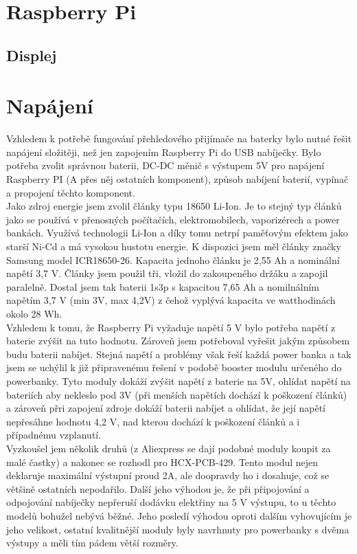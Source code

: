 \documentclass{ctuthesis}
\begin{document}
\section{Raspberry Pi}
\subsection{Displej}

\section{Napájení}
Vzhledem k potřebě fungování přehledového přijímače na baterky bylo nutné řešit napájení složitěji, než jen zapojením Raspberry Pi do USB nabíječky. Bylo potřeba zvolit správnou baterii, DC-DC měnič s výstupem 5V pro napájení Raspberry PI (A přes něj ostatních komponent), způsob nabíjení baterií, vypínač a propojení těchto komponent.\\
 Jako zdroj energie jsem zvolil články typu 18650 Li-Ion. Je to stejný typ článků jako se používá v přenosných počítačích, elektromobilech, vaporizérech a power bankách. Využívá technologii Li-Ion a díky tomu netrpí paměťovým efektem jako starší Ni-Cd a má vysokou hustotu energie. K dispozici jsem měl články značky Samsung model ICR18650-26. Kapacita jednoho článku je 2,55 Ah a nominální napětí 3,7 V. Články jsem použil tři, vložil do zakoupeného držáku a zapojil paralelně. Dostal jsem tak baterii 1s3p s kapacitou 7,65 Ah a nomilnálním napětím 3,7 V (min 3V, max 4,2V) z čehož vyplývá kapacita ve watthodinách okolo 28 Wh.\\
 Vzhledem k tomu, že Raspberry Pi vyžaduje napětí 5 V bylo potřeba napětí z baterie zvýšit na tuto hodnotu. Zároveň jsem potřeboval vyřešit jakým způsobem budu baterii nabíjet. Stejná napětí a problémy však řeší každá power banka a tak jsem se uchýlil k již připravenému řešení v podobě booster modulu určeného do powerbanky. Tyto moduly dokáží zvýšit napětí z baterie na 5V, ohlídat napětí na bateriích aby nekleslo pod 3V (při menších napětích dochází k poškození článků) a zároveň přri zapojení zdroje dokáží baterii nabíjet a ohlídat, že její napětí nepřesáhne hodnotu 4,2 V, nad kterou dochází k poškození článků a i případnému vzplanutí.\\
 Vyzkoušel jem několik druhů (z Aliexpress se dají podobné moduly koupit za malé častky) a nakonec se rozhodl pro HCX-PCB-429. Tento modul nejen deklaruje maximální výstupní proud 2A, ale doopravdy ho i dosahuje, což se většině ostatních nepodařilo. Další jeho výhodou je, že při připojování a odpojování nabíječky nepřeruší dodávku elektřiny na 5 V výstupu, to u těchto modelů bohužel nebývá běžné. Jeho posledí výhodou oproti dalším vyhovujícím je jeho velikost, ostatní kvalitnější moduly byly navrhnuty pro powerbanky s dvěma výstupy a měli tím pádem větší rozměry. \\
\end{document}
